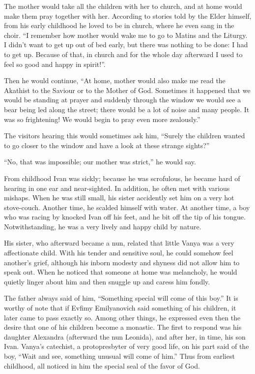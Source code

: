 The mother would take all the children with her to church, and at home would make them pray together with her. According to stories told by the Elder himself, from his early childhood he loved to be in church, where he even sang in the choir. ``I remember how mother would wake me to go to Matins and the Liturgy. I didn't want to get up out of bed early, but there was nothing to be done: I had to get up. Because of that, in church and for the whole day afterward I used to feel so good and happy in spirit!''.

Then he would continue, ``At home, mother would also make me read the Akathist to the Saviour or to the Mother of God. Sometimes it happened that we would be standing at prayer and suddenly through the window we would see a bear being led along the street; there would be a lot of noise and many people. It was so frightening! We would begin to pray even more zealously.''

The visitors hearing this would sometimes ask him, ``Surely the children wanted to go closer to the window and have a look at these strange sights?''

``No, that was impossible; our mother was strict,'' he would say.

From childhood Ivan was sickly; because he was scrofulous, he became hard of hearing in one ear and near-sighted. In addition, he often met with various mishaps. When he was still small, his sister accidently set him on a very hot stove-couch. Another time, he scalded himself with water. At another time, a boy who was racing by knocked Ivan off his feet, and he bit off the tip of his tongue. Notwithstanding, he was a very lively and happy child by nature.

His sister, who afterward became a nun, related that little Vanya was a very affectionate child. With his tender and sensitive soul, he could somehow feel another's grief, although his inborn modesty and shyness did not allow him to speak out. When he noticed that someone at home was melancholy, he would quietly linger about him and then snuggle up and caress him fondly.

The father always said of him, ``Something special will come of this boy.'' It is worthy of note that if Evfimy Emilyanovich said something of his children, it later came to pass exactly so. Among other things, he expressed even then the desire that one of his children become a monastic. The first to respond was his daughter Alexandra (afterward the nun Leonida), and after her, in time, his son Ivan. Vanya's catechist, a protopresbyter of very good life, on his part said of the boy, ``Wait and see, something unusual will come of him.'' Thus from earliest childhood, all noticed in him the special seal of the favor of God.

